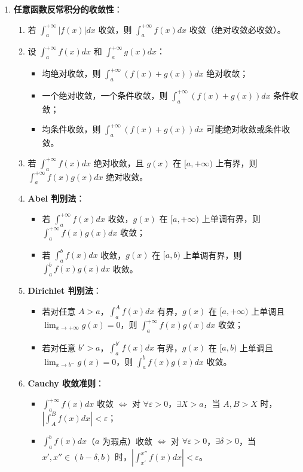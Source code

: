 \documentclass[UTF8]{ctexart}
\theoremstyle{remark}
\begin{document}
\begin{enumerate}
	\item \textbf{任意函数反常积分的收敛性}：
	\begin{enumerate}
		\item 若 \(\int_{a}^{+\infty} |f(x)| dx\) 收敛，则 \(\int_{a}^{+\infty} f(x) dx\) 收敛（绝对收敛必收敛）。
		\item 设 \(\int_{a}^{+\infty} f(x) dx\) 和 \(\int_{a}^{+\infty} g(x) dx\)：
		\begin{itemize}
			\item 均绝对收敛，则 \(\int_{a}^{+\infty} (f(x)+g(x)) dx\) 绝对收敛；
			\item 一个绝对收敛，一个条件收敛，则 \(\int_{a}^{+\infty} (f(x)+g(x)) dx\) 条件收敛；
			\item 均条件收敛，则 \(\int_{a}^{+\infty} (f(x)+g(x)) dx\) 可能绝对收敛或条件收敛。
		\end{itemize}
		\item 若 \(\int_{a}^{+\infty} f(x) dx\) 绝对收敛，且 \(g(x)\) 在 \([a, +\infty)\) 上有界，则 \(\int_{a}^{+\infty} f(x)g(x) dx\) 绝对收敛。
		\item \textbf{Abel 判别法}：
		\begin{itemize}
			\item 若 \(\int_{a}^{+\infty} f(x) dx\) 收敛，\(g(x)\) 在 \([a, +\infty)\) 上单调有界，则 \(\int_{a}^{+\infty} f(x)g(x) dx\) 收敛；
			\item 若 \(\int_{a}^{b} f(x) dx\) 收敛，\(g(x)\) 在 \([a, b)\) 上单调有界，则 \(\int_{a}^{b} f(x)g(x) dx\) 收敛。
		\end{itemize}
		\item \textbf{Dirichlet 判别法}：
		\begin{itemize}
			\item 若对任意 \(A > a\)，\(\int_{a}^{A} f(x) dx\) 有界，\(g(x)\) 在 \([a, +\infty)\) 上单调且 \(\lim_{x \to +\infty} g(x) = 0\)，则 \(\int_{a}^{+\infty} f(x)g(x) dx\) 收敛；
			\item 若对任意 \(b' > a\)，\(\int_{a}^{b'} f(x) dx\) 有界，\(g(x)\) 在 \([a, b)\) 上单调且 \(\lim_{x \to b^-} g(x) = 0\)，则 \(\int_{a}^{b} f(x)g(x) dx\) 收敛。
		\end{itemize}
		\item \textbf{Cauchy 收敛准则}：
		\begin{itemize}
			\item \(\int_{a}^{+\infty} f(x) dx\) 收敛 \(\Leftrightarrow\) 对 \(\forall \varepsilon > 0\)，\(\exists X > a\)，当 \(A, B > X\) 时，\(|\int_{A}^{B} f(x) dx| < \varepsilon\)；
			\item \(\int_{a}^{b} f(x) dx\)（\(a\) 为瑕点）收敛 \(\Leftrightarrow\) 对 \(\forall \varepsilon > 0\)，\(\exists \delta > 0\)，当 \(x', x'' \in (b-\delta, b)\) 时，\(|\int_{x'}^{x''} f(x) dx| < \varepsilon\)。
		\end{itemize}
	\end{enumerate}
	

\end{enumerate}
\end{document}
